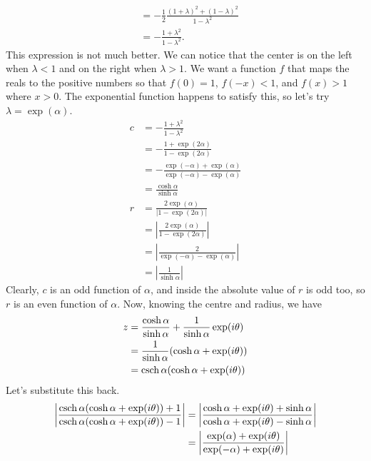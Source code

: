 \documentclass[12pt]{article}
\begin{document}
\begin{answer}
\begin{align*}
            &= -\frac{1}{2} \frac{(1+\lambda)^{2} + (1-\lambda)^{2}}{1-\lambda^{2}}\\
            &= -\frac{1+\lambda^{2}}{1-\lambda^{2}}.
        \end{align*}
        This expression is not much better.
        We can notice that 
        the center is on the left when $\lambda<1$
        and on the right when $\lambda>1$.
        We want a function $f$ that maps
        the reals to the positive numbers so that
        $f(0) = 1$, $f(-x) < 1$, and $f(x) > 1$ where $x > 0$. 
        The exponential function happens to satisfy this,
        so let's try $\lambda = \exp(\alpha)$.
        \begin{align*}
            c
            &= -\frac{1+\lambda^{2}}{1-\lambda^{2}}\\
            &= -\frac{1+\exp(2\alpha)}{1-\exp(2\alpha)}\\
            &= -\frac{\exp(-\alpha)+\exp(\alpha)}{\exp(-\alpha)-\exp(\alpha)}\\
            &= \frac{\cosh\alpha}{\sinh\alpha}\\
            r
            &= \frac{2\exp(\alpha)}{|1-\exp(2\alpha)|}\\
            &= \left|\frac{2\exp(\alpha)}{1-\exp(2\alpha)}\right|\\
            &= \left|\frac{2}{\exp(-\alpha)-\exp(\alpha)}\right|\\
            &= \left|\frac{1}{\sinh\alpha}\right|
        \end{align*}
        Clearly, $c$ is an odd function of $\alpha$,
        and inside the absolute value of $r$ is odd too,
        so $r$ is an even function of $\alpha$.
        Now, knowing the centre and radius, we have
        \begin{align*}
        z &= \frac{\cosh\alpha}{\sinh\alpha}
        + \frac{1}{\sinh\alpha}\exp(i\theta)\\
        &= \frac{1}{\sinh\alpha}(\cosh\alpha + \exp(i\theta))\\
        &= \operatorname{csch}\alpha(\cosh\alpha + \exp(i\theta))
        \end{align*}
        Let's substitute this back.
        \begin{align*}
            \left|\frac{\csch\alpha(\cosh\alpha+\exp(i\theta))+1}{\csch\alpha(\cosh\alpha+\exp(i\theta))-1}\right|
            &= \left|\frac{\cosh\alpha+\exp(i\theta)+\sinh\alpha}{\cosh\alpha+\exp(i\theta)-\sinh\alpha}\right|\\
            &= \left|\frac{\exp(\alpha)+\exp(i\theta)}{\exp(-\alpha)+\exp(i\theta)}\right|\\

\end{align*}
\end{answer}
\end{document}
